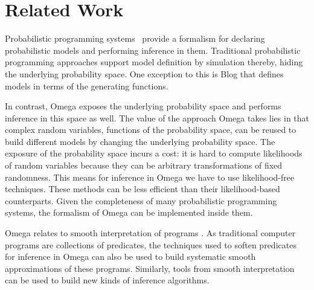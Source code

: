\section{Related Work}
Probabilistic programming systems~\citep{milch20071, wood2014new,mansinghka2014venture,goodman2008church,carpenter2017stan} provide a formalism
for declaring probabilistic models and performing inference
in them. Traditional probabilistic programming approaches support model definition by simulation thereby, hiding the underlying probability space. 
One exception to this is Blog \citep{milch20071} 
that defines models in terms of the generating functions.

In contrast, Omega exposes the underlying probability space and performs inference in this space as well. The value of the approach Omega takes lies in that complex random variables, functions of the probability space, can be reused to build different models by changing the underlying probability space. The exposure of the probability space incurs a cost: it is hard to compute likelihoods of random variables because they can be arbitrary transformations of fixed randomness. This means for inference in Omega we have to use likelihood-free techniques. These methods can be less efficient than their likelihood-based counterparts. Given the completeness of many probabilistic programming systems, the formalism of Omega can be implemented inside them.

Omega relates to smooth interpretation of programs \citep{chaudhuri2010smooth}.
As traditional computer programs are collections of predicates, the techniques used to soften predicates for inference in Omega can also be used to build systematic smooth approximations of these programs. Similarly, tools from smooth interpretation can be used to build new kinds of inference algorithms.